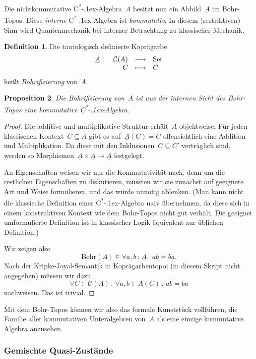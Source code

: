 \documentclass[a4paper,ngerman,12pt]{scrartcl}
\theoremstyle{definition}
\newtheorem{defn}{Definition}[section]
\theoremstyle{plain}
\newtheorem{prop}[defn]{Proposition}
\theoremstyle{remark}
\newcommand{\C}{\mathcal{C}}
\newcommand{\Bohr}{\mathrm{Bohr}}
\newcommand{\ul}[1]{\underline{#1}}
\newcommand{\csalgebra}{C\textsuperscript{*}\kern-.1ex-Algebra}
\newcommand{\Set}{\mathrm{Set}}
\renewcommand{\_}{\mathpunct{.}\,}
\newcommand{\?}{\,{:}\,}
\begin{document}
Die nichtkommutative \csalgebra~$A$ besitzt nun ein Abbild~$\ul{A}$ im
Bohr-Topos. Diese \emph{interne} \csalgebra{} ist \emph{kommutativ}. In diesem
(restriktiven) Sinn wird Quantenmechanik bei interner Betrachtung zu klassischer
Mechanik.

\begin{defn}Die tautologisch definierte Koprägarbe
\[ \begin{array}{@{}rrcl@{}}
  \ul{A}:\ & \C(A) &\longrightarrow& \Set \\
  & C &\longmapsto& C
\end{array} \]
heißt \emph{Bohrifizierung} von~$A$.\end{defn}
\begin{prop}Die Bohrifizierung von~$A$
ist aus der internen Sicht des Bohr-Topos eine \emph{kommutative} \csalgebra.
\end{prop}
\begin{proof}Die additive und multiplikative Struktur erhält~$\ul{A}$
objektweise: Für jeden klassischen Kontext~$C \subseteq A$ gibt es
auf~$\ul{A}(C) = C$ offensichtlich eine Addition und Multiplikation. Da diese
mit den Inklusionen~$C \subseteq C'$ verträglich sind, werden so
Morphismen~$\ul{A} \times \ul{A} \to \ul{A}$ festgelegt.

An Eigenschaften weisen wir nur die Kommutativität nach, denn um die restlichen
Eigenschaften zu diskutieren, müssten wir sie zunächst auf geeignete Art und
Weise formulieren, und das würde unnötig ablenken. (Man kann nicht die
klassische Definition einer \csalgebra{} naiv übernehmen, da diese sich in
einem konstruktiven Kontext wie dem Bohr-Topos nicht gut verhält. Die geeignet
umformulierte Definition ist in klassischer Logik äquivalent zur üblichen
Definition.)

Wir zeigen also
\[ \Bohr(A) \models \forall a,b\?\ul{A}\_ a b = b a. \]
Nach der Kripke-Joyal-Semantik in Koprägarbentopoi (in diesem Skript nicht
angegeben) müssen wir dazu
\[ \forall C \in \C(A)\_ \forall a,b \in \ul{A}(C)\_ a b = b a \]
nachweisen. Das ist trivial.\end{proof}

Mit dem Bohr-Topos können wir also das formale Kunststück vollführen, die
Familie aller kommutativen Unteralgebren von~$A$ als eine einzige kommutative
Algebra anzusehen.


\subsubsection*{Gemischte Quasi-Zustände}
\end{document}
